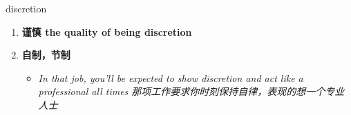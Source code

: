 
\begin{frame}
{\huge discretion}
\begin{center}
\begin{enumerate}\Large
  \item \textbf{谨慎 the quality of being discretion}
  \item \textbf{自制，节制}
  \begin{itemize}
    \item \em{\Large{In that job, you'll be expected to show discretion and act like a professional all times 那项工作要求你时刻保持自律，表现的想一个专业人士}}
  \end{itemize}
\end{enumerate}
\end{center}
\end{frame}
